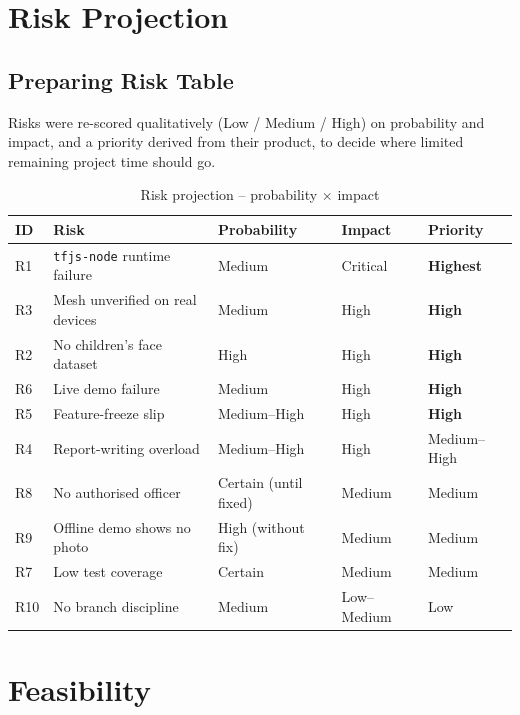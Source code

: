 \documentclass[12pt,a4paper,oneside]{report}
\newcommand{\code}[1]{\texttt{#1}}
\begin{document}
\section{Risk Projection}

\subsection{Preparing Risk Table}

Risks were re-scored qualitatively (Low / Medium / High) on probability and
impact, and a priority derived from their product, to decide where limited
remaining project time should go.

\begin{table}[H]
\centering
\caption{Risk projection -- probability $\times$ impact}
\begin{tabular}{|p{0.8cm}|p{4.4cm}|p{2.0cm}|p{2.0cm}|p{2.4cm}|}
\hline
\textbf{ID} & \textbf{Risk} & \textbf{Probability} & \textbf{Impact} & \textbf{Priority} \\
\hline
R1 & \code{tfjs-node} runtime failure & Medium & Critical & \textbf{Highest} \\ \hline
R3 & Mesh unverified on real devices & Medium & High & \textbf{High} \\ \hline
R2 & No children's face dataset & High & High & \textbf{High} \\ \hline
R6 & Live demo failure & Medium & High & \textbf{High} \\ \hline
R5 & Feature-freeze slip & Medium--High & High & \textbf{High} \\ \hline
R4 & Report-writing overload & Medium--High & High & Medium--High \\ \hline
R8 & No authorised officer & Certain (until fixed) & Medium & Medium \\ \hline
R9 & Offline demo shows no photo & High (without fix) & Medium & Medium \\ \hline
R7 & Low test coverage & Certain & Medium & Medium \\ \hline
R10 & No branch discipline & Medium & Low--Medium & Low \\
\hline
\end{tabular}
\end{table}

\section{Feasibility}
\end{document}
